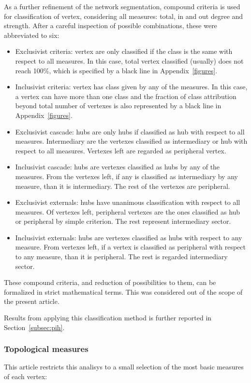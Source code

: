 \documentclass[%
 aip,
 jmp,%
 amsmath,amssymb,
 reprint,%
]{revtex4-1}
\begin{document}
As a further refinement of the network segmentation, compound criteria is used for classification of vertex, considering all measures: total, in and out degree and strength. After a careful inspection of possible combinations, these were abbreviated to six:

\begin{itemize}
    \item Exclusivist criteria: vertex are only classified if the class is the same with respect to all measures. In this case, total vertex classified (usually) does not reach 100\%, which is specified by a black line in Appendix~\ref{figures}.
    \item Inclusivist criteria: vertex has class given by any of the measures. In this case, a vertex can have more than one class and the fraction of class attribution beyond total number of vertexes is also represented by a black line in Appendix~\ref{figures}.
    \item Exclusivist cascade: hubs are only hubs if classified as hub with respect to all measures. Intermediary are the vertexes classified as intermediary or hub with respect to all measures. Vertexes left are regarded as peripheral vertex.
    \item Inclusivist cascade: hubs are vertexes classified as hubs by any of the measures. From the vertexes left, if any is classified as intermediary by any measure, than it is intermediary. The rest of the vertexes are peripheral.
    \item Exclusivist externals: hubs have unanimous classification with respect to all measures. Of vertexes left, peripheral vertexes are the ones classified as hub or peripheral by simple criterion. The rest represent intermediary sector.
    \item Inclusivist externals: hubs are vertexes classified as hubs with respect to any measure. From vertexes left, if a vertex is classified as peripheral with respect to any measure, than it is peripheral. The rest is regarded intermediary sector.
\end{itemize}

These compound criteria, and reduction of possibilities to them, can be formalized in strict mathematical terms. This was considered out of the scope of the present article. 

Results from applying this classification method is further reported in Section~\ref{subsec:pih}.

        \subsubsection{Topological measures}\label{measures}
This article
restricts this analisys to a small selection of the most basic
measures of each vertex:
\end{document}

